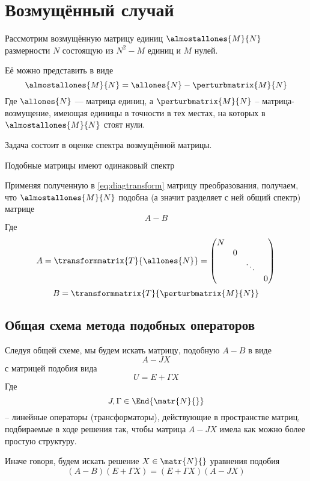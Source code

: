 \section{Возмущённый случай}

Рассмотрим возмущённую матрицу единиц
\( \almostallones{M}{N} \) размерности \( N \)
состоящую из \( N^2 - M \) единиц и \( M \) нулей.

Её можно представить в виде
\[
    \almostallones{M}{N} = \allones{N} - \perturbmatrix{M}{N}
    \]
Где \( \allones{N} \) --- матрица единиц,
а \( \perturbmatrix{M}{N} \) -- матрица-возмущение,
имеющая единицы в точности в тех местах,
на которых в \( \almostallones{M}{N} \) стоят нули.

Задача состоит в оценке спектра возмущённой матрицы.

\begin{propose}
    Подобные матрицы имеют одинаковый спектр
\end{propose}

Применяя полученную в \eqref{eq:diagtransform} матрицу преобразования,
получаем, что \( \almostallones{M}{N} \) подобна (а значит разделяет с ней общий спектр)
матрице
\[ A - B \]
Где
\[
    A = \transformmatrix{T}{\allones{N}}
    = \begin{pmatrix}
    N &   &        & \\
        & 0 &        & \\
        &   & \ddots & \\
        &   &        & 0
        \end{pmatrix}
        \]
\[
    B = \transformmatrix{T}{\perturbmatrix{M}{N}}
    \]

\subsection{Общая схема метода подобных операторов}
Следуя общей схеме, мы будем искать матрицу, подобную \( A - B \)
в виде
\[ A - J X \]
с матрицей подобия вида
\[ U = E + \Gamma X \]
Где \[ J, \Gamma \in \End{\matr{N}{}} \]
-- линейные операторы (трансформаторы), действующие в пространстве матриц,
подбираемые в ходе решения так, чтобы матрица \( A - JX \)
имела как можно более простую структуру.

Иначе говоря, будем искать решение \( X \in\matr{N}{} \)
уравнения подобия
\begin{equation}\label{eq:similarity-orig}
    (A - B)(E+\Gamma X) = (E+\Gamma X) (A - JX)
\end{equation}


